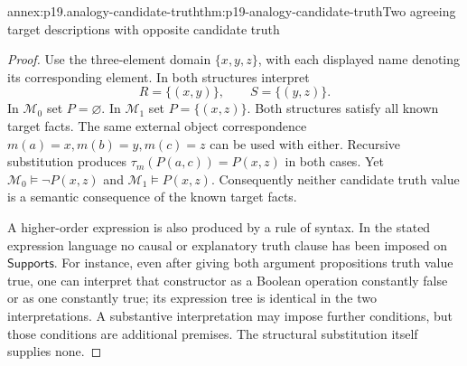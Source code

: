 \begin{annexitem}{annex:p19.analogy-candidate-truth}{thm:p19-analogy-candidate-truth}{Two agreeing target descriptions with opposite candidate truth}
\begin{proof}
Use the three-element domain \(\{x,y,z\}\),
with each displayed name denoting its
corresponding element. In both structures
interpret
\[
                  R=\{(x,y)\},\qquad S=\{(y,z)\}.
\]
In \(\mathcal M_0\) set \(P=\varnothing\).
In \(\mathcal M_1\) set \(P=\{(x,z)\}\).
Both structures satisfy all known target
facts. The same external object correspondence
\(m(a)=x,m(b)=y,m(c)=z\) can be used with
either. Recursive substitution produces
\(\tau_m(P(a,c))=P(x,z)\) in both cases.
Yet \(\mathcal M_0\models\neg P(x,z)\) and
\(\mathcal M_1\models P(x,z)\).
Consequently neither candidate truth value
is a semantic consequence of the known
target facts.

A higher-order expression is also produced
by a rule of syntax. In the stated expression
language no causal or explanatory truth
clause has been imposed on
\(\mathsf{Supports}\).
For instance, even after giving both
argument propositions truth value true,
one can interpret that constructor as a
Boolean operation constantly false or
as one constantly true; its expression
tree is identical in the two interpretations.
A substantive interpretation may impose
further conditions, but those conditions
are additional premises. The structural
substitution itself supplies none.
\end{proof}
\end{annexitem}

